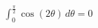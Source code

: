 \documentclass[preview]{standalone}
\begin{document}
\begin{align*}
\int_0^{\frac{\pi}{2}} \cos(2\theta) \, d\theta = 0
\end{align*}
\end{document}
